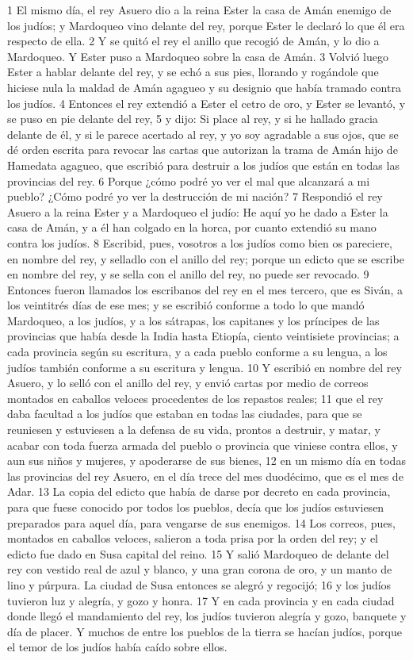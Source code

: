 1 El mismo día, el rey Asuero dio a la reina Ester la casa de Amán enemigo de los judíos; y Mardoqueo vino delante del rey, porque Ester le declaró lo que él era respecto de ella.
2 Y se quitó el rey el anillo que recogió de Amán, y lo dio a Mardoqueo. Y Ester puso a Mardoqueo sobre la casa de Amán.
3 Volvió luego Ester a hablar delante del rey, y se echó a sus pies, llorando y rogándole que hiciese nula la maldad de Amán agagueo y su designio que había tramado contra los judíos.
4 Entonces el rey extendió a Ester el cetro de oro, y Ester se levantó, y se puso en pie delante del rey,
5 y dijo: Si place al rey, y si he hallado gracia delante de él, y si le parece acertado al rey, y yo soy agradable a sus ojos, que se dé orden escrita para revocar las cartas que autorizan la trama de Amán hijo de Hamedata agagueo, que escribió para destruir a los judíos que están en todas las provincias del rey.
6 Porque ¿cómo podré yo ver el mal que alcanzará a mi pueblo? ¿Cómo podré yo ver la destrucción de mi nación?
7 Respondió el rey Asuero a la reina Ester y a Mardoqueo el judío: He aquí yo he dado a Ester la casa de Amán, y a él han colgado en la horca, por cuanto extendió su mano contra los judíos.
8 Escribid, pues, vosotros a los judíos como bien os pareciere, en nombre del rey, y selladlo con el anillo del rey; porque un edicto que se escribe en nombre del rey, y se sella con el anillo del rey, no puede ser revocado.
9 Entonces fueron llamados los escribanos del rey en el mes tercero, que es Siván, a los veintitrés días de ese mes; y se escribió conforme a todo lo que mandó Mardoqueo, a los judíos, y a los sátrapas, los capitanes y los príncipes de las provincias que había desde la India hasta Etiopía, ciento veintisiete provincias; a cada provincia según su escritura, y a cada pueblo conforme a su lengua, a los judíos también conforme a su escritura y lengua.
10 Y escribió en nombre del rey Asuero, y lo selló con el anillo del rey, y envió cartas por medio de correos montados en caballos veloces procedentes de los repastos reales;
11 que el rey daba facultad a los judíos que estaban en todas las ciudades, para que se reuniesen y estuviesen a la defensa de su vida, prontos a destruir, y matar, y acabar con toda fuerza armada del pueblo o provincia que viniese contra ellos, y aun sus niños y mujeres, y apoderarse de sus bienes,
12 en un mismo día en todas las provincias del rey Asuero, en el día trece del mes duodécimo, que es el mes de Adar.
13 La copia del edicto que había de darse por decreto en cada provincia, para que fuese conocido por todos los pueblos, decía que los judíos estuviesen preparados para aquel día, para vengarse de sus enemigos.
14 Los correos, pues, montados en caballos veloces, salieron a toda prisa por la orden del rey; y el edicto fue dado en Susa capital del reino.
15 Y salió Mardoqueo de delante del rey con vestido real de azul y blanco, y una gran corona de oro, y un manto de lino y púrpura. La ciudad de Susa entonces se alegró y regocijó;
16 y los judíos tuvieron luz y alegría, y gozo y honra.
17 Y en cada provincia y en cada ciudad donde llegó el mandamiento del rey, los judíos tuvieron alegría y gozo, banquete y día de placer. Y muchos de entre los pueblos de la tierra se hacían judíos, porque el temor de los judíos había caído sobre ellos.

